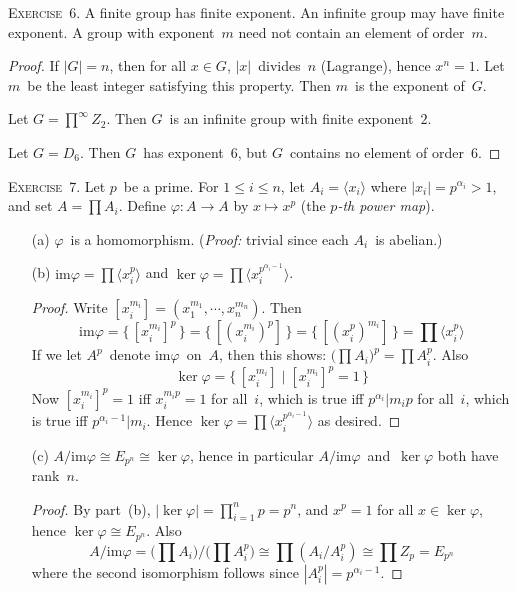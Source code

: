 \documentclass[letterpaper]{article}
\newcommand{\exercise}[1]{\goodbreak\noindent\textsc{Exercise~{#1}.}}
\newcommand{\iso}{\cong}
\newcommand{\im}{\mathrm{im}}
\newcommand{\ord}[1]{|{#1}|}
\newcommand{\gen}[1]{\langle{#1}\rangle}
\begin{document}
\exercise{6}
A finite group has finite exponent. An infinite group may have finite exponent. A group with exponent~$m$ need not contain an element of order~$m$.
\begin{proof}
If $\ord{G}=n$, then for all $x\in G$, $\ord{x}$~divides~$n$ (Lagrange), hence $x^n=1$. Let $m$~be the least integer satisfying this property. Then $m$~is the exponent of~$G$.

Let $G=\prod^{\infty} Z_2$. Then $G$~is an infinite group with finite exponent~$2$.

Let $G=D_6$. Then $G$~has exponent~$6$, but $G$~contains no element of order~$6$.
\end{proof}

\exercise{7}
Let $p$~be a prime. For $1\le i\le n$, let $A_i=\gen{x_i}$ where $\ord{x_i}=p^{\alpha_i}>1$, and set $A=\prod A_i$. Define $\varphi:A\to A$ by $x\mapsto x^p$ (the \emph{$p$-th power map}).
\begin{enumerate}[itemsep=0pt]
\item[(a)] $\varphi$~is a homomorphism. (\emph{Proof:} trivial since each $A_i$~is abelian.)
\item[(b)] $\im\varphi=\prod\gen{x_i^p}$ and $\ker\varphi=\prod\gen{x_i^{p^{\alpha_i-1}}}$.
\begin{proof}
Write $[x_i^{m_i}]=(x_1^{m_1},\cdots,x_n^{m_n})$. Then
$$\im\varphi=\bigl\{\,[x_i^{m_i}]^p\,\bigr\}=\bigl\{\,[(x_i^{m_i})^p]\,\bigr\}=\bigl\{\,[(x_i^p)^{m_i}]\,\bigr\}=\prod\gen{x_i^p}$$
If we let $A^p$~denote $\im\varphi$~on~$A$, then this shows: $\bigl(\prod A_i\bigr)^p=\prod A_i^p$. Also
$$\ker\varphi=\bigl\{\,[x_i^{m_i}]\mid [x_i^{m_i}]^p=1\,\bigr\}$$
Now $[x_i^{m_i}]^p=1$ iff $x_i^{m_ip}=1$ for all~$i$, which is true iff $p^{\alpha_i}|m_ip$ for all~$i$, which is true iff $p^{\alpha_i-1}|m_i$. Hence $\ker\varphi=\prod\gen{x_i^{p^{\alpha_i-1}}}$ as desired.
\end{proof}
\item[(c)] $A/\im\varphi\iso E_{p^n}\iso\ker\varphi$, hence in particular $A/\im\varphi$~and~$\ker\varphi$ both have rank~$n$.
\begin{proof}
By part~(b), $\ord{\ker\varphi}=\prod_{i=1}^n p=p^n$, and $x^p=1$ for all $x\in\ker\varphi$, hence $\ker\varphi\iso E_{p^n}$. Also
$$A/\im\varphi=\bigl(\prod A_i\bigr)/\bigl(\prod A_i^p\bigr)\iso\prod(A_i/A_i^p)\iso\prod Z_p=E_{p^n}$$
where the second isomorphism follows since $\ord{A_i^p}=p^{\alpha_i-1}$.
\end{proof}
\end{enumerate}
\end{document}
